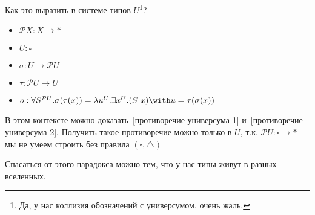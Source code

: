 Как это выразить в системе типов \(U\)\footnote{Да, у нас коллизия обозначений с универсумом, очень жаль.}?
\begin{itemize}
    \item \(\mathcal{P} X : X \to *\)
    \item \(U : \square\)
    \item \(\sigma : U \to \mathcal{P} U\)
    \item \(\tau : \mathcal{P} U \to U\)
    \item \(o : \forall S^{\mathcal{P} U}.\sigma(\tau(x)) = \lambda u^U.\exists x^U.(S\ x) \with u = \tau(\sigma(x))\)
\end{itemize}
В этом контексте можно доказать~\ref{противоречие универсума 1} и~\ref{противоречие универсума 2}. Получить такое противоречие можно только в \(U\), т.к. \(\mathcal{P} U : \square \to *\) мы не умеем строить без правила \((\square, \triangle)\)

Спасаться от этого парадокса можно тем, что у нас типы живут в разных вселенных.
